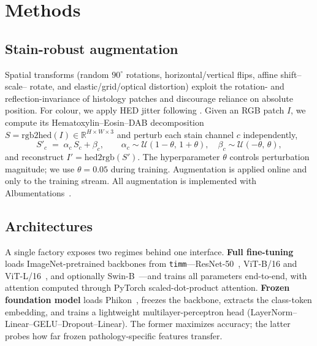 \documentclass[11pt]{article}
\begin{document}
\section{Methods}

\subsection{Stain-robust augmentation}
Spatial transforms (random $90^\circ$ rotations, horizontal/vertical flips, affine shift--scale--
rotate, and elastic/grid/optical distortion) exploit the rotation- and reflection-invariance of
histology patches and discourage reliance on absolute position. For colour, we apply HED jitter
following \citet{tellez2019quantifying}. Given an RGB patch $I$, we compute its
Hematoxylin--Eosin--DAB decomposition $S=\mathrm{rgb2hed}(I)\in\mathbb{R}^{H\times W\times 3}$ and
perturb each stain channel $c$ independently,
\begin{equation}
S'_{c} \;=\; \alpha_c\, S_{c} + \beta_c,\qquad
\alpha_c \sim \mathcal{U}(1-\theta,\,1+\theta),\quad
\beta_c \sim \mathcal{U}(-\theta,\,\theta),
\end{equation}
and reconstruct $I'=\mathrm{hed2rgb}(S')$. The hyperparameter $\theta$ controls perturbation
magnitude; we use $\theta=0.05$ during training. Augmentation is applied online and only to the
training stream. All augmentation is implemented with Albumentations~\citep{buslaev2020albumentations}.

\subsection{Architectures}
A single factory exposes two regimes behind one interface. \textbf{Full fine-tuning} loads
ImageNet-pretrained backbones from \texttt{timm}---ResNet-50~\citep{he2016deep,wightman2021resnet},
ViT-B/16 and ViT-L/16~\citep{dosovitskiy2021image,steiner2022how}, and optionally
Swin-B~\citep{liu2021swin}---and trains all parameters end-to-end, with attention computed through
PyTorch scaled-dot-product attention. \textbf{Frozen foundation model} loads
Phikon~\citep{filiot2023scaling}, freezes the backbone, extracts the class-token embedding, and
trains a lightweight multilayer-perceptron head (LayerNorm--Linear--GELU--Dropout--Linear). The
former maximizes accuracy; the latter probes how far frozen pathology-specific features transfer.
\end{document}
